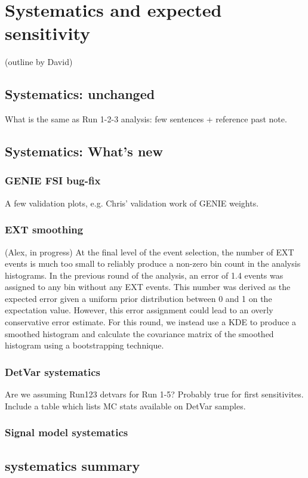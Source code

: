 \section{Systematics and expected sensitivity}
(outline by David)

\subsection{Systematics: unchanged}What is the same as Run 1-2-3 analysis: few sentences + reference past note.
\subsection{Systematics: What's new}
\subsubsection{GENIE FSI bug-fix} A few validation plots, e.g. Chris' validation work of GENIE weights.
\subsubsection{EXT smoothing} (Alex, in progress)
At the final level of the event selection, the number of EXT events is much too small to reliably produce a non-zero bin count in the analysis histograms. In the previous round of the analysis, an error of 1.4 events was assigned to any bin without any EXT events. This number was derived as the expected error given a uniform prior distribution between 0 and 1 on the expectation value. However, this error assignment could lead to an overly conservative error estimate. For this round, we instead use a KDE to produce a smoothed histogram and calculate the covariance matrix of the smoothed histogram using a bootstrapping technique.
\subsubsection{DetVar systematics} Are we assuming Run123 detvars for Run 1-5? Probably true for first sensitivites. \\
Include a table which lists MC stats available on DetVar samples.
\subsubsection{Signal model systematics}

\subsection{systematics summary}


